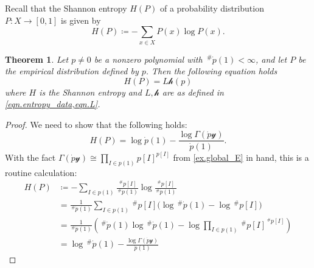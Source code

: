 \documentclass[11pt, one side, article]{memoir}
\theoremstyle{definition}
\theoremstyle{plain}
\newtheorem{theorem}[definitionx]{Theorem}
\newcommand{\card}{\,^{\#}}
\newcommand{\yon}{\mathcal{y}}
\newcommand{\hh}{\mathcal{h}}
\newcommand{\0}{\textsf{0}}
\newcommand{\1}{\tn{\textsf{1}}}
\begin{document}
Recall that the Shannon entropy $H(P)$ of a probability distribution $P\colon X\to[0,1]$ is given by
\[
H(P)\coloneqq-\sum_{x\in X}P(x)\log P(x).
\]

\begin{theorem}\label{thm.main}
Let $p\neq0$ be a nonzero polynomial with $\card\dot{p}(1)<\infty$, and let $P$ be the empirical distribution defined by $p$. Then the following equation holds
\[
H(P)=L\hh(p)
\]
where $H$ is the Shannon entropy and $L,\hh$ are as defined in \cref{eqn.entropy_data,eqn.L}.
\end{theorem}
\begin{proof}
We need to show that the following holds:
\[
H(P)=\log\dot{p}(1)-\frac{\log\Gamma(\dot{p}\yon)}{\dot{p}(1)}.
\]
With the fact $\Gamma(\dot{p}\yon)\cong\prod_{I\in p(1)}p[I]^{p[I]}$ from \cref{ex.global_E} in hand, this is a routine calculation:
\begin{align*}
	H(P)&\coloneqq
	-\sum_{I\in p(1)}\frac{\card p[I]}{\card\dot{p}(1)}\log \frac{\card p[I]}{\card\dot{p}(1)}\\&=
	\frac{1}{\card\dot{p}(1)}\sum_{I\in p(1)}\card p[I]\big(\log\card\dot{p}(1)-\log\card p[I]\big)\\&=
	\frac{1}{\card\dot{p}(1)}\left(\card\dot{p}(1)\log\card\dot{p}(1)-\log\prod_{I\in p(1)}\card p[I]^{\card p[I]}\right)\\&=
	\log\card\dot{p}(1)-\frac{\log\Gamma(\dot{p}\yon)}{\dot{p}(1)}
\end{align*}
\end{proof}


\printbibliography 
\end{document}
